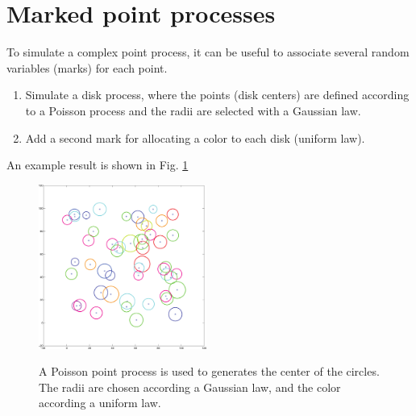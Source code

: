 \vspace*{-7pt}

\section{Marked point processes}\vspace*{-5pt}
To simulate a complex point process, it can be useful to associate several random variables (marks) for each point.

\begin{qbox}
\begin{enumerate}
	\item Simulate a disk process, where the points (disk centers) are defined according to a Poisson process and the radii are selected 
with a Gaussian law.
	\item Add a second mark for allocating a color to each disk (uniform law).
\end{enumerate}
\end{qbox}%

An example result is shown in Fig. \ref{fig:point_process_generation:circles}
\vspace*{-10pt}
\begin{figure}[H]
 \centering\caption{A Poisson point process is used to generates the center of the circles. The radii are chosen according a Gaussian law, and the 
 	color according a uniform law.}%
 \includegraphics[width=5.5cm]{../matlab/circles.pdf}%
 \label{fig:point_process_generation:circles}%
\end{figure}

